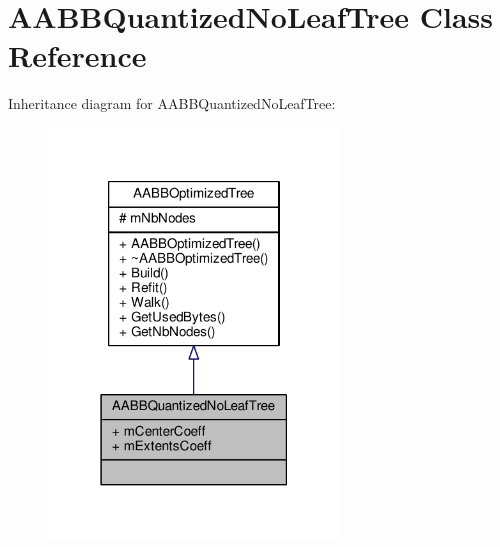 \hypertarget{classAABBQuantizedNoLeafTree}{}\section{A\+A\+B\+B\+Quantized\+No\+Leaf\+Tree Class Reference}
\label{classAABBQuantizedNoLeafTree}


Inheritance diagram for A\+A\+B\+B\+Quantized\+No\+Leaf\+Tree\+:
\nopagebreak
\begin{figure}[H]
\begin{center}
\leavevmode
\includegraphics[width=219pt]{da/d67/classAABBQuantizedNoLeafTree__inherit__graph}
\end{center}
\end{figure}


